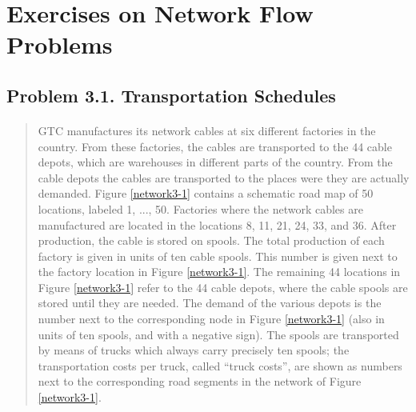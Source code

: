\section{Exercises on Network Flow Problems}

\subsection{Problem 3.1. Transportation Schedules}

\paragraph{}
\begin{quote}
GTC manufactures its network cables at six different factories in the country. From these factories, the cables are transported to the 44 cable depots, which are warehouses in different parts of the country. From the cable depots the cables are transported to the places were they are actually demanded.
Figure \ref{network3-1} contains a schematic road map of 50 locations, labeled 1, ..., 50. Factories where the network cables are manufactured are located in the locations 8, 11, 21, 24, 33, and 36. After production, the cable is stored on spools. The total production of each factory is given in units of ten cable spools. This number is given next to the factory location in Figure \ref{network3-1}. The remaining 44 locations in Figure \ref{network3-1} refer to the 44 cable depots, where the cable spools are stored until they are needed. The demand of the various depots is the number next to the corresponding node in Figure \ref{network3-1} (also in units of ten spools, and with a negative sign). The spools are transported by means of trucks which always carry precisely ten spools; the transportation costs per truck, called ``truck costs'', are shown as numbers next to the corresponding road segments in the network of Figure \ref{network3-1}.
\end{quote}

